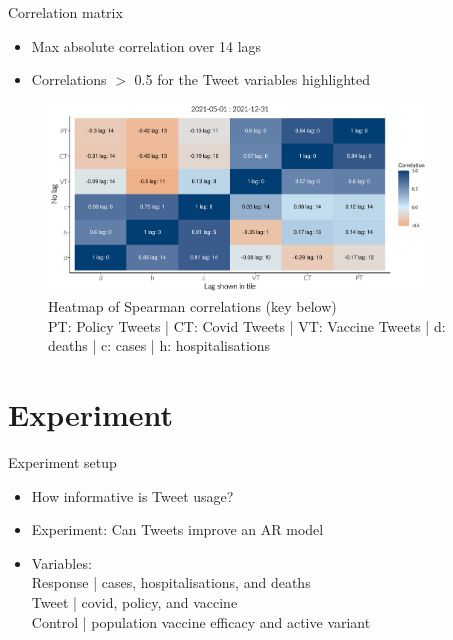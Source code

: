 \documentclass{beamer}
\begin{document}
 \begin{frame}{Correlation matrix} 
  \begin{itemize}
  \item Max absolute correlation over 14 lags
  \item Correlations $>$ 0.5 for the Tweet variables highlighted
  \end{itemize}
  
  \begin{figure}[!ht]
    \centering
    \includegraphics[width=0.9\textwidth]{figures/rrs_heatmap_formatted_wave3.pdf}
    \caption{Heatmap of Spearman correlations (key below)\\PT: Policy Tweets | CT: Covid Tweets | VT: Vaccine Tweets | d: deaths | c: cases | h: hospitalisations}
  \end{figure} 
\end{frame}


\section{Experiment}
\begin{frame}{Experiment setup}
  \begin{itemize}
  \item How informative is Tweet usage? \\[10pt]
  \item Experiment: Can Tweets improve an AR model \\[10pt]
  \item Variables: \\[5pt]
    Response | cases, hospitalisations, and deaths \\[5pt]  
    Tweet \hspace{0.5cm}| covid, policy, and vaccine \\[5pt] 
    Control \hspace{0.125cm}  | population vaccine efficacy and active variant
  \end{itemize}
\end{frame}
\end{document}
